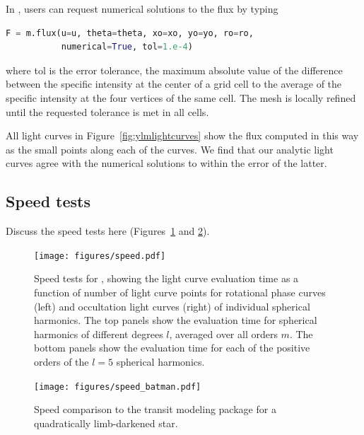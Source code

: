 \documentclass[modern]{aastex61}
\begin{document}
In \starry, users can request numerical solutions to the flux by typing
%
\begin{lstlisting}[language=Python,firstnumber=last]
F = m.flux(u=u, theta=theta, xo=xo, yo=yo, ro=ro,
           numerical=True, tol=1.e-4)
\end{lstlisting}
%
where \textsf{tol} is the error tolerance, the maximum absolute value of the
difference between the
specific intensity at the center of a grid cell to the average of the specific
intensity at the four vertices of the same cell. The mesh is locally
refined until the requested tolerance is met in all cells.

All light curves in Figure~\ref{fig:ylmlightcurves} show the flux computed
in this way as the small points along each of the curves. We find that our
analytic light curves agree with the numerical solutions to within the error
of the latter.

\subsection{Speed tests}
\label{sec:starryspeed}

Discuss the speed tests here (Figures~\ref{fig:speed} and \ref{fig:speed_batman}).

\begin{figure}[ht!]
    \begin{centering}
    \texttt{[image: figures/speed.pdf]}
    \caption{\label{fig:speed}
             Speed tests for \starry, showing the light curve evaluation time
             as a function of number of light curve points for rotational
             phase curves (left) and occultation light curves (right) of individual
             spherical harmonics. The top
             panels show the evaluation time for spherical harmonics of different
             degrees $l$, averaged over all orders $m$. The bottom panels
             show the evaluation time for each of the positive orders
             of the $l = 5$ spherical harmonics.
             }
    \end{centering}
\end{figure}

\begin{figure}[ht!]
    \begin{centering}
    \texttt{[image: figures/speed\_batman.pdf]}
    \caption{\label{fig:speed_batman}
             Speed comparison to the \batman transit modeling package
             \citep{Kreidberg2015} for a quadratically limb-darkened star.
             }
    \end{centering}
\end{figure}
\end{document}
